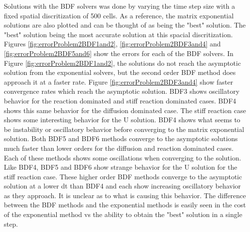Solutions with the BDF solvers was done by varying the time step size with a fixed spatial discritization of 500 cells. As a reference, the matrix exponential solutions are also plotted and can be thought of as being the "best" solution. The "best" solution being the most accurate solution at this spacial discritization. Figures \ref{fig:errorProblem2BDF1and2}, \ref{fig:errorProblem2BDF3and4} and \ref{fig:errorProblem2BDF5and6} show the errors for each of the BDF solvers. In Figure \ref{fig:errorProblem2BDF1and2}, the solutions do not reach the asymptotic solution from the exponential solvers, but the second order BDF method does approach it at a faster rate. Figure \ref{fig:errorProblem2BDF3and4} show faster convergence rates which reach the asymptotic solution. BDF3 shows oscillatory behavior for the reaction dominated and stiff reaction dominated cases. BDF4 shows this same behavior for the diffusion dominated case. The stiff reaction case shows some interesting behavior for the U solution. BDF4 shows what seems to be instability or oscillatory behavior before converging to the matrix exponential solution. Both BDF5 and BDF6 methods converge to the asymptotic solutions much faster than lower orders for the diffusion and reaction dominated cases. Each of these methods shows some oscillations when converging to the solution. Like BDF4, BDF5 and BDF6 show strange behavior for the U solution for the stiff reaction case. These higher order BDF methods converge to the asymptotic solution at a lower dt than BDF4 and each show increasing oscillatory behavior as they approach. It is unclear as to what is causing this behavior. The difference between the BDF methods and the exponential methods is easily seen in the cost of the exponential method vs the ability to obtain the "best" solution in a single step. 

\FloatBarrier

